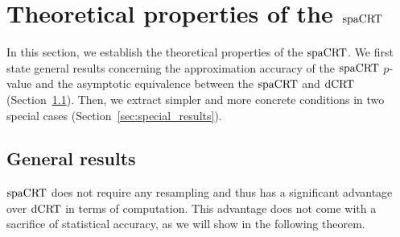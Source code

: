 \documentclass[12pt]{article}
\theoremstyle{definition}
\newcommand{\dCRT}{\textnormal{dCRT}} 					%
\newcommand{\spacrt}{\textnormal{spaCRT}}               %
\begin{document}
\section{Theoretical properties of the $\spacrt$}\label{sec:theory}

In this section, we establish the theoretical properties of the $\spacrt$. We first state general results concerning the approximation accuracy of the $\spacrt$ $p$-value and the asymptotic equivalence between the $\spacrt$ and $\dCRT$ (Section~\ref{sec:general_results}). Then, we extract simpler and more concrete conditions in two special cases (Section~\ref{sec:special_results}). 

\subsection{General results}\label{sec:general_results}

$\spacrt$ does not require any resampling and thus has a significant advantage over $\dCRT$ in terms of computation. This advantage does not come with a sacrifice of statistical accuracy, as we will show in the following theorem.
\end{document}
